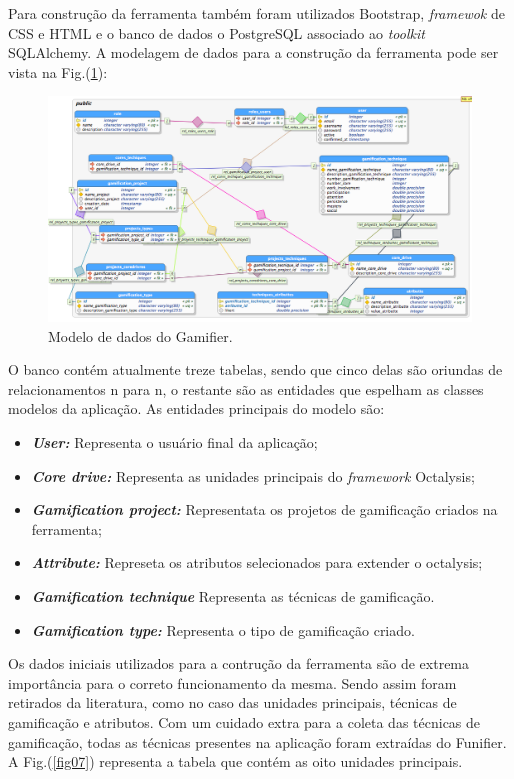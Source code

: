 Para construção da ferramenta também foram utilizados Bootstrap, \textit{framewok} de CSS e HTML e o banco de dados o PostgreSQL associado ao \textit{toolkit} SQLAlchemy. A modelagem de dados para a construção da ferramenta pode ser vista na Fig.(\ref{fig06}):

\begin{figure}[h]
	\centering
		\includegraphics[keepaspectratio=true,scale=0.4]{figuras/gamifierdados.png}
	\caption{Modelo de dados do Gamifier.\label{fig06}}
\end{figure}

O banco contém atualmente treze tabelas, sendo que cinco delas são oriundas de relacionamentos n para n, o restante são as entidades que espelham as classes modelos da aplicação. 
As entidades principais do modelo são:

\begin{itemize}
\item  \textbf \textit{User:} Representa o usuário final da aplicação;
\item  \textbf \textit{Core drive:} Representa as unidades principais do  \textit{framework} Octalysis;
\item  \textbf \textit{Gamification project:} Representata os projetos de gamificação criados na ferramenta;
\item  \textbf \textit{Attribute:} Represeta os atributos selecionados para extender o octalysis;
\item  \textbf \textit{Gamification technique} Representa as técnicas de gamificação.
\item  \textbf \textit{Gamification type:} Representa o tipo de gamificação criado.
\end{itemize}

Os dados iniciais utilizados para a contrução da ferramenta são de extrema importância para o correto funcionamento da mesma. Sendo assim foram retirados da literatura, como no caso das unidades principais, técnicas de gamificação e atributos. Com um cuidado extra para a coleta das técnicas de gamificação, todas as técnicas presentes na aplicação foram extraídas do Funifier. A Fig.(\ref{fig07}) representa a tabela que contém as oito unidades principais.


